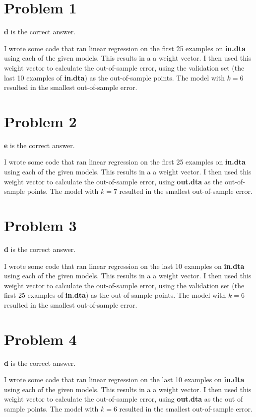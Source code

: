 \documentclass{article}
\begin{document}
\section*{Problem 1}
\textbf{d} is the correct answer.

\noindent I wrote some code that ran linear regression on the first 25
examples on \textbf{in.dta} using each of the given models. This results in a
a weight vector. I then used this weight vector to calculate the out-of-sample
error, using the validation set (the last 10 examples of \textbf{in.dta})
as the out-of-sample points. The model with $k = 6$ resulted in the smallest
out-of-sample error.

\section*{Problem 2}
\textbf{e} is the correct answer.

\noindent I wrote some code that ran linear regression on the first 25
examples on \textbf{in.dta} using each of the given models. This results in a
a weight vector. I then used this weight vector to calculate the out-of-sample
error, using \textbf{out.dta} as the out-of-sample points. The model with
$k = 7$ resulted in the smallest out-of-sample error.

\section*{Problem 3}
\textbf{d} is the correct answer.

\noindent I wrote some code that ran linear regression on the last 10
examples on \textbf{in.dta} using each of the given models. This results in a
a weight vector. I then used this weight vector to calculate the out-of-sample
error, using the validation set (the first 25 examples of \textbf{in.dta})
as the out-of-sample points. The model with $k = 6$ resulted in the smallest
out-of-sample error.

\section*{Problem 4}
\textbf{d} is the correct answer.

\noindent I wrote some code that ran linear regression on the last 10
examples on \textbf{in.dta} using each of the given models. This results in a
a weight vector. I then used this weight vector to calculate the out-of-sample
error, using \textbf{out.dta} as the out of sample points. The model with
$k = 6$ resulted in the smallest out-of-sample error.
\end{document}
